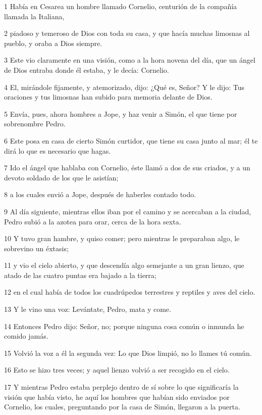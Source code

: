 \par 1 Había en Cesarea un hombre llamado Cornelio, centurión de la compañía llamada la Italiana,
\par 2 piadoso y temeroso de Dios con toda su casa, y que hacía muchas limosnas al pueblo, y oraba a Dios siempre.
\par 3 Este vio claramente en una visión, como a la hora novena del día, que un ángel de Dios entraba donde él estaba, y le decía: Cornelio.
\par 4 El, mirándole fijamente, y atemorizado, dijo: ¿Qué es, Señor? Y le dijo: Tus oraciones y tus limosnas han subido para memoria delante de Dios.
\par 5 Envía, pues, ahora hombres a Jope, y haz venir a Simón, el que tiene por sobrenombre Pedro.
\par 6 Este posa en casa de cierto Simón curtidor, que tiene su casa junto al mar; él te dirá lo que es necesario que hagas.
\par 7 Ido el ángel que hablaba con Cornelio, éste llamó a dos de sus criados, y a un devoto soldado de los que le asistían;
\par 8 a los cuales envió a Jope, después de haberles contado todo.
\par 9 Al día siguiente, mientras ellos iban por el camino y se acercaban a la ciudad, Pedro subió a la azotea para orar, cerca de la hora sexta.
\par 10 Y tuvo gran hambre, y quiso comer; pero mientras le preparaban algo, le sobrevino un éxtasis;
\par 11 y vio el cielo abierto, y que descendía algo semejante a un gran lienzo, que atado de las cuatro puntas era bajado a la tierra;
\par 12 en el cual había de todos los cuadrúpedos terrestres y reptiles y aves del cielo.
\par 13 Y le vino una voz: Levántate, Pedro, mata y come.
\par 14 Entonces Pedro dijo: Señor, no; porque ninguna cosa común o inmunda he comido jamás.
\par 15 Volvió la voz a él la segunda vez: Lo que Dios limpió, no lo llames tú común.
\par 16 Esto se hizo tres veces; y aquel lienzo volvió a ser recogido en el cielo.
\par 17 Y mientras Pedro estaba perplejo dentro de sí sobre lo que significaría la visión que había visto, he aquí los hombres que habían sido enviados por Cornelio, los cuales, preguntando por la casa de Simón, llegaron a la puerta.
